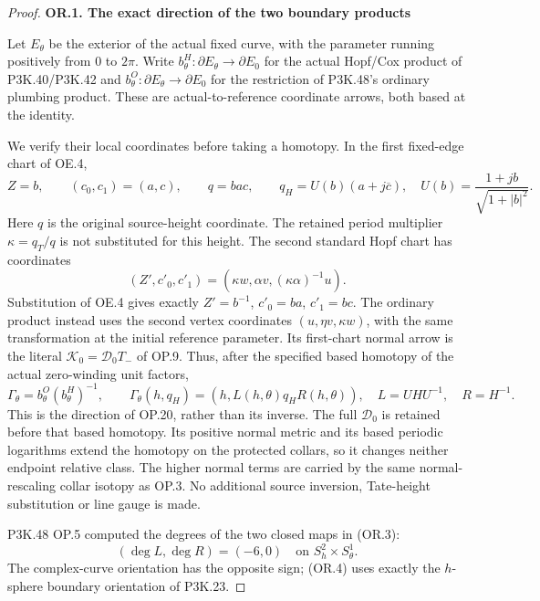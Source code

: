 \begin{proof}
\par

\medskip\noindent\textbf{OR.1. The exact direction of the two boundary products}

\par\nobreak

Let \(E_\theta\) be the exterior of the actual fixed curve, with the
parameter running positively from \(0\) to \(2\pi\). Write
\(b^H_\theta:\partial E_\theta\to\partial E_0\) for the actual
Hopf/Cox product of P3K.40/P3K.42 and
\(b^O_\theta:\partial E_\theta\to\partial E_0\) for the restriction
of P3K.48's ordinary plumbing product. These are actual-to-reference
coordinate arrows, both based at the identity.

We verify their local coordinates before taking a homotopy. In the
first fixed-edge chart of OE.4,
\[
 Z=b,\qquad(c_0,c_1)=(a,c),\qquad q=bac,\qquad
 q_H=U(b)(a+j\overline c),\quad
 U(b)=\frac{1+jb}{\sqrt{1+|b|^2}}.                 \tag{OR.1}
\]
Here \(q\) is the original source-height coordinate. The retained
period multiplier \(\kappa=q_T/q\) is not substituted for this
height. The second standard Hopf chart has coordinates
\[
 (Z',c'_0,c'_1)=(\kappa w,\alpha v,(\kappa\alpha)^{-1}u).
                                                               \tag{OR.2}
\]
Substitution of OE.4 gives exactly
\(Z'=b^{-1}\), \(c'_0=ba\), \(c'_1=bc\).
The ordinary product instead uses the second vertex coordinates
\((u,\eta v,\kappa w)\), with the same transformation at the
initial reference parameter. Its first-chart normal arrow is the
literal \(\mathcal K_0=\mathcal D_0 T_-\) of OP.9. Thus, after the
specified based homotopy of the actual zero-winding unit factors,
\[
 \Gamma_\theta=b^O_\theta(b^H_\theta)^{-1},\qquad
 \Gamma_\theta(h,q_H)=
       (h,L(h,\theta)q_H R(h,\theta)),
 \quad L=UHU^{-1},\quad R=H^{-1}.                     \tag{OR.3}
\]
This is the direction of OP.20, rather than its inverse. The full
\(\mathcal D_0\) is retained before that based homotopy. Its
positive normal metric and its based periodic logarithms extend the
homotopy on the protected collars, so it changes neither endpoint
relative class. The higher normal terms are carried by the same
normal-rescaling collar isotopy as OP.3. No additional source
inversion, Tate-height substitution or line gauge is made.

P3K.48 OP.5 computed the degrees of the two closed maps in (OR.3):
\[
 (\deg L,\deg R)=(-6,0)
 \quad\text{on }S^2_h\times S^1_\theta.                \tag{OR.4}
\]
The complex-curve orientation has the opposite sign; (OR.4) uses
exactly the \(h\)-sphere boundary orientation of P3K.23.


\end{proof}
